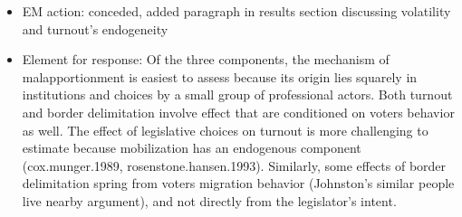 \documentclass{article}
\begin{document}
\begin{enumerate}
\label{sec:orgheadline10}
\begin{itemize}
\item EM action: conceded, added paragraph in results section discussing volatility and turnout's endogeneity
\item Element for response: Of the three components, the mechanism of malapportionment is easiest to assess because its origin lies squarely in institutions and choices by a small group of professional actors. Both turnout and border delimitation involve effect that are conditioned on voters behavior as well. The effect of legislative choices on turnout is more challenging to estimate because mobilization has an endogenous component (cox.munger.1989, rosenstone.hansen.1993). Similarly, some effects of border delimitation spring from voters migration behavior (Johnston's similar people live nearby argument), and not directly from the legislator's intent. 


\end{itemize}
\end{enumerate}
\end{document}
